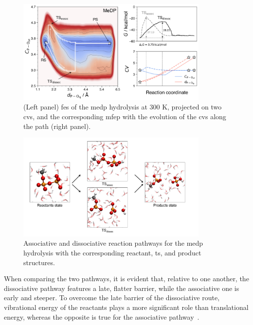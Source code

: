 \begin{figure}[ht]
    \centering
    \includegraphics[width=0.85\textwidth]{Figures/4_Results/results_MeDP_300K_fes_mfep.png}
    \caption{(Left panel) \ac{fes} of the \ac{medp} hydrolysis at 300 K, projected on two \acp{cv}, and the corresponding \ac{mfep} with the evolution of the \acp{cv} along the path (right panel).}
    \label{fig:medp_300k_fes_mfep}
\end{figure}

\begin{figure}[ht]
    \centering
    \includegraphics[width=0.85\textwidth]{Figures/4_Results/results_medp_mechanism.pdf}
    \caption{Associative and dissociative reaction pathways for the \ac{medp} hydrolysis with the corresponding reactant, \ac{ts}, and product structures.}
    \label{fig:medp_reaction_mechanism}
\end{figure}

When comparing the two pathways, it is evident that, relative to one another, the dissociative pathway features a late, flatter barrier, while the associative one is early and steeper. To overcome the late barrier of the dissociative route, vibrational energy of the reactants plays a more significant role than translational energy, whereas the opposite is true for the associative pathway~\citep{polanyiConceptsReactionDynamics1987}.

